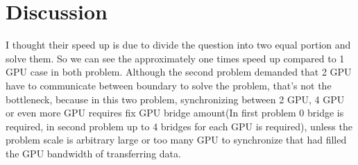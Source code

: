 \documentclass{article}
\begin{document}
	\section{Discussion}
	I thought their speed up is due to divide the question into two equal portion and solve them. So we can see the approximately one times speed up compared to 1 GPU case in both problem. Although the second problem demanded that 2 GPU have to communicate between boundary to solve the problem, that's not the bottleneck, because in this two problem, synchronizing between 2 GPU, 4 GPU or even more GPU requires fix GPU bridge amount(In first problem 0 bridge is required, in second problem up to 4 bridges for each GPU is required), unless the problem scale is arbitrary large or too many GPU to synchronize that had filled the GPU bandwidth of transferring data.
\end{document}
